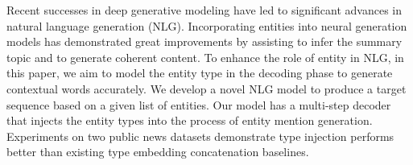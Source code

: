 Recent successes in deep generative modeling have led to significant advances in natural language generation (NLG). Incorporating entities into neural generation models has demonstrated great improvements by assisting to infer the summary topic and to generate coherent content. To enhance the role of entity in NLG, in this paper, we aim to model the entity type in the decoding phase to generate contextual words accurately. We develop a novel NLG model to produce a target sequence based on a given list of entities. Our model has a multi-step decoder that injects the entity types into the process of entity mention generation. Experiments on two public news datasets demonstrate type injection performs better than existing type embedding concatenation baselines.
